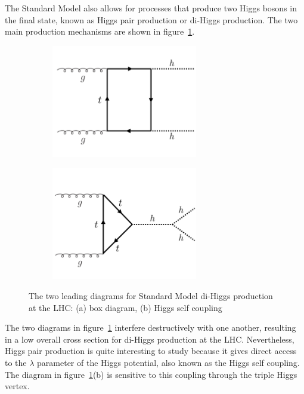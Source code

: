 The Standard Model also allows for processes that produce two Higgs bosons in the final state, known as Higgs pair production or di-Higgs production. The two main production mechanisms are shown in figure~\ref{fig:diHiggs}.
%
\begin{figure}[h!]
  \centering
  \captionsetup{justification=centering}

   \begin{subfigure}[t]{0.5\textwidth}
        \centering
        \includegraphics[width=0.7\textwidth]{figures/HH_box}
        \caption{}
    \end{subfigure}%
    \begin{subfigure}[t]{0.5\textwidth}
        \centering
        \includegraphics[width=0.7\textwidth]{figures/HH_lambda}
        \caption{}
    \end{subfigure}
   \caption{The two leading diagrams for Standard Model di-Higgs production at the LHC: (a) box diagram, (b) Higgs self coupling}
  \label{fig:diHiggs}
\end{figure}
%
The two diagrams in figure~\ref{fig:diHiggs} interfere destructively with one another, resulting in a low overall cross section for di-Higgs production at the LHC. Nevertheless, Higgs pair production is quite interesting to study because it gives direct access to the $\lambda$ parameter of the Higgs potential, also known as the Higgs self coupling. The diagram in figure~\ref{fig:diHiggs}(b) is sensitive to this coupling through the triple Higgs vertex.  

